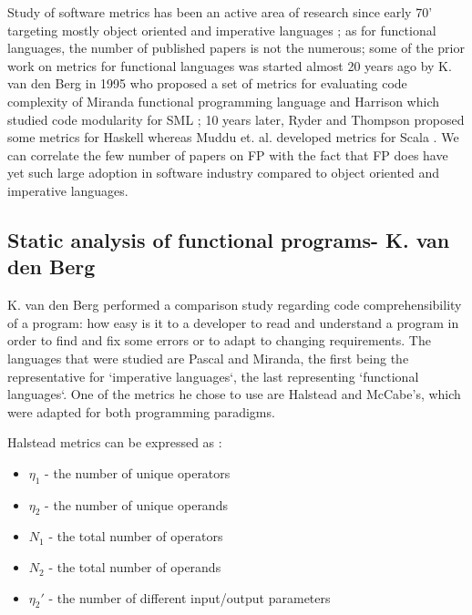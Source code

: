 \documentclass{article}
\begin{document}
Study of software metrics has been an active area of research since early 70' targeting mostly object oriented and imperative languages \cite{RyderT05:TFP_2005_Intellect}; as for functional languages, the number of published papers is not the numerous; some of the prior work on metrics for functional languages was started almost 20 years ago by K. van den Berg in 1995 \cite{DBLP:journals/infsof/BergB95} who proposed a set of metrics for evaluating code complexity of Miranda functional programming language and Harrison which studied code modularity for SML \cite{eps250597}; 10 years later, Ryder and Thompson proposed some metrics for Haskell \cite{RyderT05:TFP_2005_Intellect} whereas  Muddu et. al. developed metrics for Scala \cite{DBLP:conf/icse/MudduABP13}. We can correlate the few number of papers on FP with the fact that FP does have yet such large adoption in software industry compared to object oriented and imperative languages.  \par

\subsection{Static analysis of functional programs- K. van den Berg}
K. van den Berg performed a comparison study regarding code comprehensibility of a program: how easy is it to a developer to read and understand a program in order to find and fix some errors or to adapt to changing requirements. The languages that were studied are Pascal and Miranda, the first being the representative for `imperative languages`, the last representing `functional languages`. One of the metrics he chose to use are Halstead and McCabe's, which were adapted for both programming paradigms. \par

Halstead metrics can be expressed as :

\begin{itemize}
\item $\eta_1$ - the number of unique operators \par
\item $\eta_2$ - the number of unique operands \par
\item $N_1$ - the total number of operators \par
\item$N_2$ - the total number of operands \par
\item$\eta_2'$ - the number of different input/output parameters \par
\end{itemize}
\end{document}
